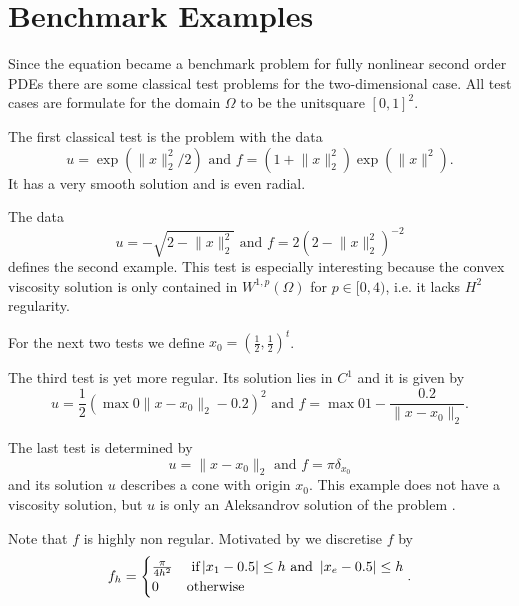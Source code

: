 \section{Benchmark Examples}

Since the \MA equation became a benchmark problem for fully nonlinear second order PDEs there are some classical test problems for the two-dimensional case. All test cases are formulate for the domain $\Omega$ to be the unitsquare $[0,1]^2$.

\begin{test} \label{test smooth}
The first classical \MA test is the problem with the data
\[
	u=\exp( \lVert x \rVert_2^2  /2) 
	\text { and } 
	f = (1 + \lVert x \rVert_2^2) \exp( \lVert x \rVert^2).
\]
It has a very smooth solution and is even radial.

\end{test}

\begin{test}\label{test sqrt}
The data
\[
	u = - \sqrt{ 2-  \lVert x \rVert_2^2}
	\text { and } 
	f = 2\left( 2-  \lVert x \rVert_2^2 \right)^{-2}
\]
defines the second example. This test is especially interesting because the convex viscosity solution is only contained in $W^{1,p}(\Omega) $ for $p \in [0,4)$\cite{DG2006a}, i.e. it lacks $H^2$ regularity.
\end{test}

For the next two tests we define $x_0 = \left(\frac 1 2, \frac 1 2  \right)^t$.

\begin{test}\label{test singularity}
The third \MA test is yet more regular. Its solution lies in $C^1$ and it is given by
\[
	u=\frac 1 2 \left( \max 0 {\lVert x - x_0 \rVert_2-0.2 }  \right)^2 
	\text { and } 
	f = \max 0 {1-\frac {0.2} {\lVert x - x_0 \rVert_2} }.
\]
\end{test}


\begin{test}\label{test dirac}
The last test is determined by
\[
	u = \lVert x - x_0 \rVert_2
	\text { and } 
	f = \pi \delta_{x_0}
\]
and its solution $u$ describes a cone with origin $x_0$. This example does not have a viscosity solution, but $u$ is only an Aleksandrov solution of the problem \cite[Section 2.3.]{FO2011}.

Note that $f$ is highly non regular. Motivated by \cite[Section 6.1.]{FO2011} we discretise $f$ by
\begin{align*}
	f_h = \begin{cases}
		\frac \pi {4h^2} & \text{ if} \left| x_1 - 0.5 \right| \leq h \text{ and } \left| x_e - 0.5 \right| \leq h \\
		0	& \text{otherwise}
	\end{cases}.
\end{align*}
\end{test}


